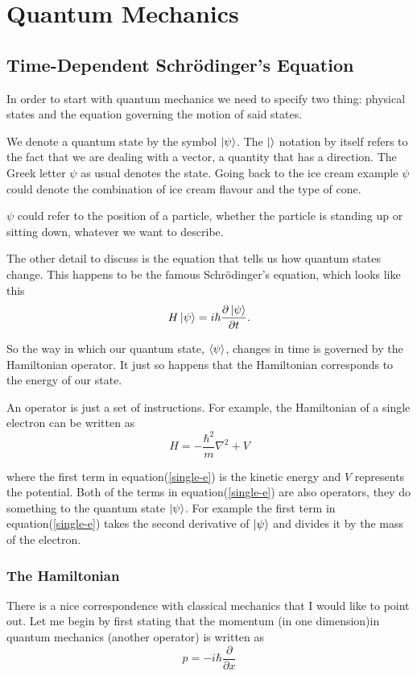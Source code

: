 \documentclass[a4paper]{article}
\begin{document}
\section{Quantum Mechanics}
\subsection{Time-Dependent Schr\"odinger's Equation}
In order to start with quantum mechanics we need to specify two thing: physical states and the equation governing the motion of said states.

We denote a quantum state by the symbol $\ket{\psi}$. 
The $\ket{  }$ notation by itself refers to the fact that we are dealing with a vector, a quantity that has a direction. 
The Greek letter $\psi$ as usual denotes the state. 
Going back to the ice cream example $\psi$ could denote the combination of ice cream flavour and the type of cone.

$\psi$ could refer to the position of a particle, whether the particle is standing up or sitting down, whatever we want to describe.

The other detail to discuss is the equation that tells us how quantum states change.
This happens to be the famous Schr\"odinger's equation, which looks like this
\begin{equation}\label{time-dependent}
H\ket{\psi} = i\hbar \frac{\partial \ket{\psi}}{\partial t}.
\end{equation} 

So the way in which our quantum state, $\braket{\psi}$, changes in time is governed by the Hamiltonian operator.
It just so happens that the Hamiltonian corresponds to the energy of our state. 

An operator is just a set of instructions.
For example, the Hamiltonian of a single electron can be written as
\begin{equation} \label{single-e}
H = - \frac{\hbar^2}{m} \nabla^2 + V
\end{equation}

where the first term in equation(\ref{single-e}) is the kinetic energy and $V$ represents the potential.
Both of the terms in equation(\ref{single-e}) are also operators, they do something to the quantum state $\ket{\psi}$.
For example the first term in equation(\ref{single-e}) takes the second derivative of $\ket{\psi}$ and divides it by the mass of the electron.

\subsubsection{The Hamiltonian}
There is a nice correspondence with classical mechanics that I would like to point out.
Let me begin by first stating that the momentum (in one dimension)in quantum mechanics (another operator) is written as
$$
p = -i\hbar \frac{\partial}{\partial x}
$$
\end{document}
